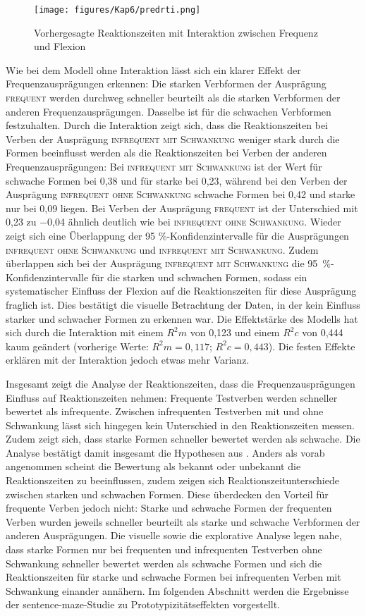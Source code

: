 \begin{figure}
\texttt{[image: figures/Kap6/predrti.png]} 
\caption{Vorhergesagte Reaktionszeiten mit Interaktion zwischen Frequenz und Flexion}
\label{predrtfreq}
\end{figure}

Wie bei dem Modell ohne Interaktion lässt sich ein klarer Effekt der Frequenzausprägungen erkennen: Die starken Verbformen der Ausprägung \textsc{frequent} werden durchweg schneller beurteilt als die starken Verbformen der anderen Frequenzausprägungen. Dasselbe ist für die schwachen Verbformen festzuhalten. Durch die Interaktion zeigt sich, dass die Reaktionszeiten bei Verben der Ausprägung \textsc{infrequent mit Schwankung} weniger stark durch die Formen beeinflusst werden als die Reaktionszeiten bei Verben der anderen Frequenzausprägungen: Bei \textsc{infrequent mit Schwankung} ist der Wert für schwache Formen bei 0,38 und für starke bei 0,23, während bei den Verben der Ausprägung \textsc{infrequent ohne Schwankung} schwache Formen bei 0,42 und starke nur bei 0,09 liegen. Bei Verben der Ausprägung \textsc{frequent} ist der Unterschied mit 0,23 zu −0,04 ähnlich deutlich wie bei \textsc{infrequent ohne Schwankung}. Wieder zeigt sich eine Überlappung der 95 \%-Konfidenzintervalle für die Ausprägungen \textsc{infrequent ohne Schwankung} und \textsc{infrequent mit Schwankung}. Zudem überlappen sich bei der Ausprägung \textsc{infrequent mit Schwankung} die 95~\%-Konfidenzintervalle für die starken und schwachen Formen, sodass ein systematischer Einfluss der Flexion auf die Reaktionszeiten für diese Ausprägung fraglich ist. Dies bestätigt die visuelle Betrachtung der Daten, in der kein Einfluss starker und schwacher Formen zu erkennen war. Die Effektstärke des Modells hat sich durch die Interaktion mit einem $R^2m$ von 0,123 und einem $R^2c$ von 0,444 kaum geändert (vorherige Werte: $R^2m = 0{,}117$; $R^2c = 0{,}443$). Die festen Effekte erklären mit der Interaktion jedoch etwas mehr Varianz.

Insgesamt zeigt die Analyse der Reaktionszeiten, dass die Frequenzausprägungen Einfluss auf Reaktionszeiten nehmen: Frequente Testverben werden schneller bewertet als infrequente. Zwischen infrequenten Testverben mit und ohne Schwankung lässt sich hingegen kein Unterschied in den Reaktionszeiten messen. Zudem zeigt sich, dass starke Formen schneller bewertet werden als schwache. Die Analyse bestätigt damit insgesamt die Hypothesen aus . Anders als vorab angenommen scheint die Bewertung als bekannt oder unbekannt die Reaktionszeiten zu beeinflussen, zudem zeigen sich Reaktionszeitunterschiede zwischen starken und schwachen Formen. Diese überdecken den Vorteil für frequente Verben jedoch nicht: Starke und schwache Formen der frequenten Verben wurden jeweils schneller beurteilt als starke und schwache Verbformen der anderen Ausprägungen. Die visuelle sowie die explorative Analyse legen nahe, dass starke Formen nur bei frequenten und infrequenten Testverben ohne Schwankung schneller bewertet werden als schwache Formen und sich die Reaktionszeiten für starke und schwache Formen bei infrequenten Verben mit Schwankung einander annähern. 
Im folgenden Abschnitt werden die Ergebnisse der sentence-maze-Studie zu Prototypizitätseffekten vorgestellt.

